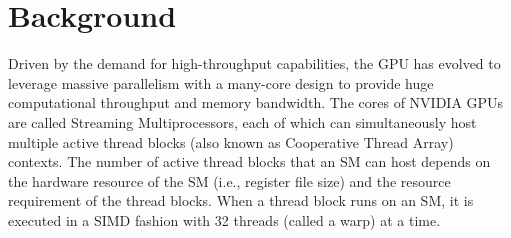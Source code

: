 
\section{Background}
\label{sec:back}
\vspace{-.2cm}
Driven by the demand for high-throughput capabilities, the GPU has evolved to leverage massive 
parallelism with a many-core design to provide huge computational throughput and memory bandwidth. 
The cores of NVIDIA GPUs are called Streaming Multiprocessors, each of which can simultaneously 
host multiple active thread blocks (also known as Cooperative Thread Array) contexts. 
The number of active thread blocks that an SM can host depends on the hardware resource of the SM 
(i.e., register file size) and the resource requirement of the thread blocks. 
When a thread block runs on an SM, it is executed in a SIMD fashion with 32 threads (called a warp) at a time. 
